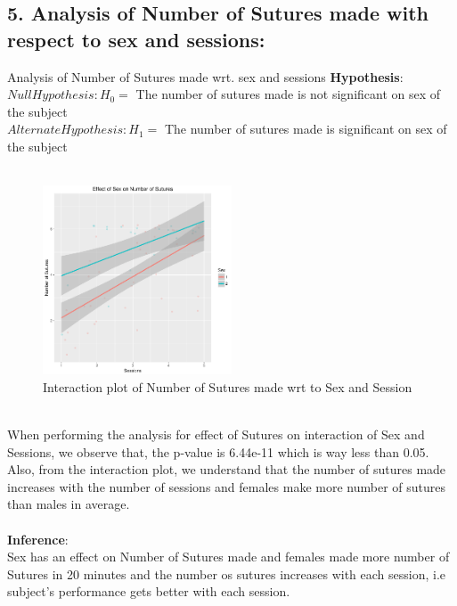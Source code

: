 \documentclass[12pt,epsf]{report}
\begin{document}
\subsection*{5. Analysis of Number of Sutures made with respect to sex and sessions:}
 {Analysis of Number of Sutures made wrt. sex and sessions}
\textbf{Hypothesis}:\\
$Null Hypothesis : H_0 = $ The number of sutures made is not significant on sex of the subject\\
$Alternate Hypothesis : H_1 = $ The number of sutures made is  significant on sex of the subject\\
\\
\begin{figure}[!htb]
	\centering
	\includegraphics[width=0.5\textwidth]{SuturingVsSex.pdf}
	\caption{Interaction plot of Number of Sutures made wrt to Sex and Session}
	\centering
\end{figure}
\\
When performing the analysis for effect of Sutures on interaction of Sex and Sessions, we observe that, the p-value is 6.44e-11 which is way less than 0.05.\\
Also, from the interaction plot, we understand that the number of sutures made increases with the number of sessions and females make more number of sutures than males in average.\\
\\
\textbf{Inference}:\\
Sex has an effect on Number of Sutures made and females made more number of Sutures in 20 minutes and the number os sutures increases with each session, i.e subject's performance gets better with each session.\\






\newpage
\end{document}
